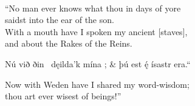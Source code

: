  \\
“No man ever knows what thou in days of yore \\
saidst into the ear of the son. \\
With a  mouth have I spoken my ancient [staves], \\
and about the Rakes of the Reins.\evb
\evg


\bvg\bva{}Nú við ðin \hld\ dęilda’k mína ; &
\ind þú est ę́ ísastr era.“\eva

\bvb Now with Weden have I shared my word-wisdom; \\
thou art ever wisest of beings!”\evb
\evg
